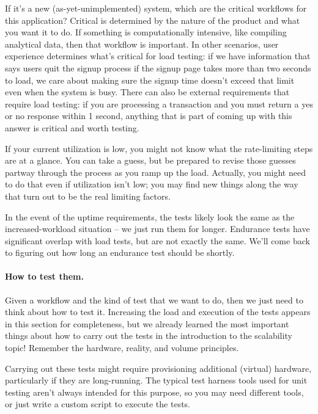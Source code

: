 If it's a new (as-yet-unimplemented) system, which are the critical workflows for this application? Critical is determined by the nature of the product and what you want it to do. If something is computationally intensive, like compiling analytical data, then that workflow is important. In other scenarios, user experience determines what's critical for load testing: if we have information that says users quit the signup process if the signup page takes more than two seconds to load, we care about making sure the signup time doesn't exceed that limit even when the system is busy. There can also be external requirements that require load testing: if you are processing a transaction and you must return a yes or no response within 1 second, anything that is part of coming up with this answer is critical and worth testing.

If your current utilization is low, you might not know what the rate-limiting steps are at a glance. You can take a guess, but be prepared to revise those guesses partway through the process as you ramp up the load. Actually, you might need to do that even if utilization isn't low; you may find new things along the way that turn out to be the real limiting factors. 

In the event of the uptime requirements, the tests likely look the same as the increased-workload situation -- we just run them for longer. Endurance tests have significant overlap with load tests, but are not exactly the same. We'll come back to figuring out how long an endurance test should be shortly.

\paragraph{How to test them.}
Given a workflow and the kind of test that we want to do, then we just need to think about how to test it. Increasing the load and execution of the tests appears in this section for completeness, but we already learned the most important things about how to carry out the tests in the introduction to the scalability topic! Remember the hardware, reality, and volume principles. 

Carrying out these tests might require provisioning additional (virtual) hardware, particularly if they are long-running. The typical test harness tools used for unit testing aren't always intended for this purpose, so you may need different tools, or just write a custom script to execute the tests.

